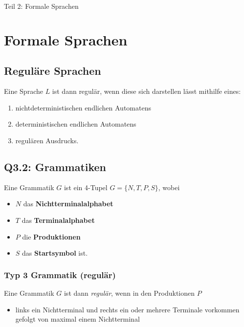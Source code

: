 \begin{titlepage}\centering
    \vspace*{\fill}
    \LARGE Teil 2: Formale Sprachen
    \vspace*{\fill}
\end{titlepage}
\chapter{Formale Sprachen}
%
\section{Reguläre Sprachen}
\begin{definition}
    Eine Sprache $L$ ist dann regulär, wenn diese sich darstellen lässt mithilfe eines:
    \begin{enumerate}
        \item nichtdeterministischen endlichen Automatens
        \item deterministischen endlichen Automatens
        \item regulären Ausdrucks.
    \end{enumerate}
\end{definition}
\section{Q3.2: Grammatiken}
\begin{definition}
    Eine Grammatik $G$ ist ein 4-Tupel $G=\{N,T,P,S\}$, wobei
    \begin{itemize}
        \item $N$ das \textbf{Nichtterminalalphabet}
        \item $T$ das \textbf{Terminalalphabet}
        \item $P$ die \textbf{Produktionen}
        \item $S$ das \textbf{Startsymbol} ist.
    \end{itemize}
\end{definition}
\subsection{Typ 3 Grammatik (regulär)}
Eine Grammatik $G$ ist dann \textit{regulär}, wenn in den Produktionen $P$
\begin{itemize}
    \item links ein Nichtterminal und rechts ein oder mehrere Terminale vorkommen gefolgt von maximal einem Nichtterminal
\end{itemize}

